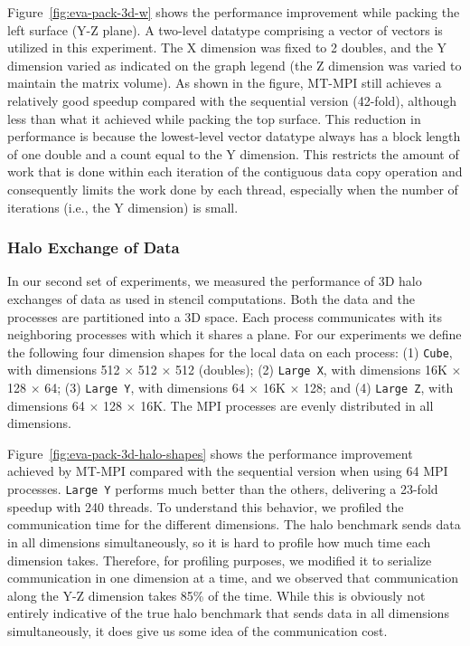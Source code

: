 Figure~\ref{fig:eva-pack-3d-w} shows the performance improvement while
pac\-king the left surface (Y-Z plane).  A two-level datatype comprising
a vector of vectors is utilized in this experiment.  The X dimension
was fixed to 2 doubles, and the Y dimension varied as indicated on the
graph legend (the Z dimension was varied to maintain the matrix
volume).  As shown in the figure, MT-MPI still achieves a relatively
good speedup compared with the sequential version (42-fold), although
less than what it achieved while packing the top surface.  This
reduction in performance is because the lowest-level vector datatype
always has a block length of one double and a count equal to the Y
dimension.  This restricts the amount of work that is done within each
iteration of the contiguous data copy operation and consequently
limits the work done by each thread, especially when the number of
iterations (i.e., the Y dimension) is small.


\subsubsection{Halo Exchange of Data}

In our second set of experiments, we measured the performance of 3D
halo exchanges of data as used in stencil computations.  Both the data
and the processes are partitioned into a 3D space.  Each process
communicates with its neighboring processes with which it shares a
plane.  For our experiments we define the following four dimension
shapes for the local data on each process: (1) {\tt Cube}, with
dimensions 512 $\times$ 512 $\times$ 512 (doubles); (2) {\tt Large X},
with dimensions 16K $\times$ 128 $\times$ 64; (3) {\tt Large Y}, with
dimensions 64 $\times$ 16K $\times$ 128; and (4) {\tt Large Z}, with
dimensions 64 $\times$ 128 $\times$ 16K.  The MPI processes are evenly
distributed in all dimensions.

Figure~\ref{fig:eva-pack-3d-halo-shapes} shows the performance
improvement achieved by MT-MPI compared with the sequential version
when using 64 MPI processes.  {\tt Large Y} performs much better than
the others, delivering a 23-fold speedup with 240 threads.  To
understand this behavior, we profiled the communication time for the
different dimensions.  The halo benchmark sends data in all dimensions
simultaneously, so it is hard to profile how much time each dimension
takes.  Therefore, for profiling purposes, we modified it to serialize
communication in one dimension at a time, and we observed that
communication along the Y-Z dimension takes 85\% of the time.  While
this is obviously not entirely indicative of the true halo benchmark
that sends data in all dimensions simultaneously, it does give us some
idea of the communication cost.

